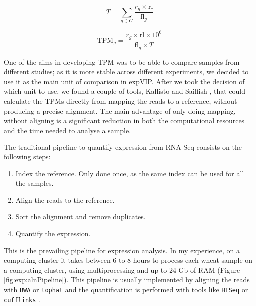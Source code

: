 \begin{equation}
\label{eq:exp:T}
T = \displaystyle\sum_{g \in G} \frac{r_{g} \times \textrm{rl}}{\textrm{fl}_{g}}
\end{equation}

\begin{equation}
\label{eq:exp:tpm}
  \textrm{TPM}_{g} = \frac{r_{g} \times \textrm{rl}\times10^6}{\textrm{fl}_{g} \times T }
\end{equation}


One of the aims in developing TPM was to be able to compare samples from different studies; as it is more stable across different experiments, we decided to use it as the main unit of comparison in expVIP. 
After we took the decision of which unit to use, we found a couple of tools, Kallisto \citep{Bray2016} and Sailfish \citep{Patro2014}, that could calculate the TPMs directly from mapping the reads to a reference, without producing a precise alignment.
The main advantage of only doing mapping, without aligning is a significant reduction in both the computational resources and the time needed to analyse a sample.

The traditional pipeline to quantify expression from RNA-Seq consists on the following steps:
\begin{enumerate}
  \item Index the reference. Only done once, as the same index can be used for all the samples. 
  \item Align the reads to the reference. 
  \item Sort the alignment and remove duplicates. 
  \item Quantify the expression.  
\end{enumerate}
This is the prevailing pipeline for expression analysis. 
In my experience, on a computing cluster it takes between 6 to 8 hours to process each wheat sample on a computing cluster, using multiprocessing and up to 24 Gb of RAM (Figure \ref{fig:exp:alnPipeline}). 
This pipeline is usually implemented by aligning the reads with \verb|BWA| \citep{Li2009} or \verb|tophat|  \citep{Trapnell2012} and the quantification is performed with tools like \verb|HTSeq| \citep{Anders2015} or \verb|cufflinks| \citep{Trapnell2012}.


